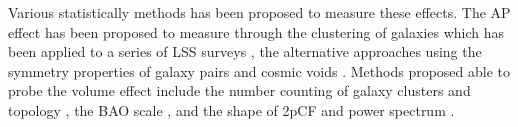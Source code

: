 \documentclass[iop]{emulateapj}
\begin{document}
Various statistically methods has been proposed to measure these effects.
The AP effect has been proposed to measure through the clustering of galaxies \citep{Ballinger1996,Matsubara1996} which has been applied to a series of LSS surveys
\citep{Outram2004,Blake2011,ChuangWang2012,Reid2012,Beutler2013,Linder2013,2014arXiv1407.2257S, Jeong2014,Sutter2014,2014ApJ...781...96L,Alam2016, Beutler2016, Sanchez2016},
the alternative approaches using the symmetry properties of galaxy pairs \citep{Marinoni2010,Jennings2011,BB2012}
and cosmic voids \citep{Ryden1995,LavausWandelt1995,Sutter2014,Qingqing2016}.
Methods proposed able to probe the volume effect include the number counting of 
galaxy clusters \citep{PS1974,VL1996} and topology \citep{topology},
the BAO scale \citep{EHT1998,BG03,SE03},
and the shape of 2pCF and power spectrum \citep{Sanchez2006,Sanchez2009}.





\end{document}

